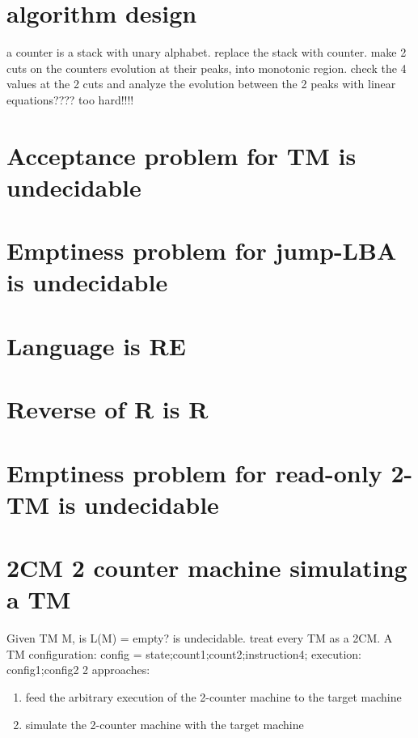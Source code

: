 \documentclass{article}
\begin{document}
\section{algorithm design}
a counter is a stack with unary alphabet. replace the stack with counter. make 2 cuts on the counters evolution at their peaks, into monotonic region. check the 4 values at the 2 cuts and analyze the evolution between the 2 peaks with linear equations???? too hard!!!!

\section{Acceptance problem for TM is undecidable}

\section{Emptiness problem for jump-LBA is undecidable}

\section{Language is RE}

\section{Reverse of R is R}

\section{Emptiness problem for read-only 2-TM is undecidable}

\section{2CM 2 counter machine simulating a TM}
Given TM M, is L(M) = empty? is undecidable.
treat every TM as a 2CM. A TM configuration:
config = state;count1;count2;instruction4;
execution:
config1;config2
2 approaches:
\begin{enumerate}
	\item feed the arbitrary execution of the 2-counter machine to the target machine
	\item simulate the 2-counter machine with the target machine
\end{enumerate}
\end{document}

